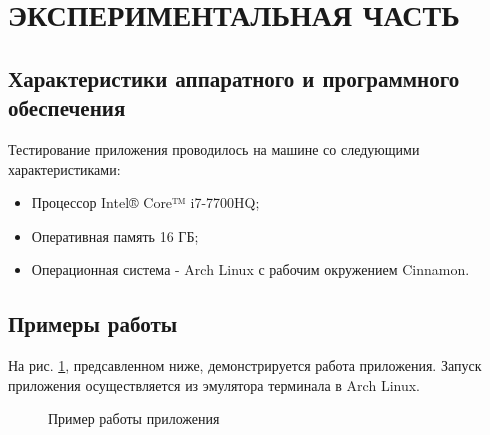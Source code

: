 \documentclass[a4paper,12pt]{article}
\begin{document}
\newpage
\section{ЭКСПЕРИМЕНТАЛЬНАЯ ЧАСТЬ}
\subsection{Характеристики аппаратного и программного обеспечения}
Тестирование приложения проводилось на машине со следующими характеристиками:\\
\begin{itemize}
\item Процессор Intel® Core™ i7-7700HQ;
\item Оперативная память 16 ГБ;
\item Операционная система - Arch Linux с рабочим окружением Cinnamon.
\end{itemize}

\newpage
\subsection{Примеры работы}
На рис. \ref{images:example}, предсавленном ниже, демонстрируется работа приложения. Запуск приложения осуществляется из эмулятора терминала в Arch Linux.
\begin{figure}[h]
\caption{Пример работы приложения}
\label{images:example}
\end{figure}
\end{document}
